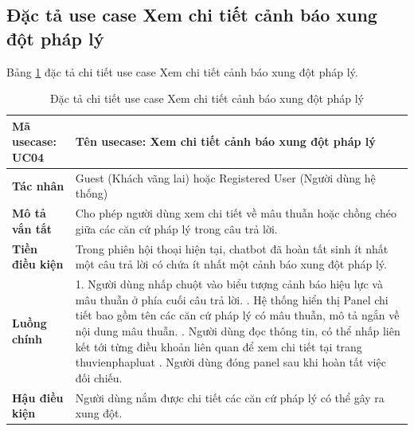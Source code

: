 \documentclass[../DoAn.tex]{subfiles}
\begin{document}
\subsection{Đặc tả use case Xem chi tiết cảnh báo xung đột pháp lý}
Bảng \ref{table:uc_specs_conflict} đặc tả chi tiết use case Xem chi tiết cảnh báo xung đột pháp lý.
\begin{table}[H]
\centering
\begin{tabular}{|p{3.5cm}|p{11.5cm}|}
\hline
\textbf{Mã usecase:} UC04 & \textbf{Tên usecase:} Xem chi tiết cảnh báo xung đột pháp lý \\ \hline
\textbf{Tác nhân} & Guest (Khách vãng lai) hoặc Registered User (Người dùng hệ thống) \\ \hline
\textbf{Mô tả vắn tắt} & Cho phép người dùng xem chi tiết về mâu thuẫn hoặc chồng chéo giữa các căn cứ pháp lý trong câu trả lời. \\ \hline
\textbf{Tiền điều kiện} & Trong phiên hội thoại hiện tại, chatbot đã hoàn tất sinh ít nhất một câu trả lời có chứa ít nhất một cảnh báo xung đột pháp lý. \\ \hline
\textbf{Luồng chính} &
1. Người dùng nhấp chuột vào biểu tượng cảnh báo hiệu lực và mâu thuẫn ở phía cuối câu trả lời. \newline
2. Hệ thống hiển thị Panel chi tiết bao gồm tên các căn cứ pháp lý có mâu thuẫn, mô tả ngắn về nội dung mâu thuẫn. \newline
3. Người dùng đọc thông tin, có thể nhấp liên kết tới từng điều khoản liên quan để xem chi tiết tại trang thuvienphapluat \newline
4. Người dùng đóng panel sau khi hoàn tất việc đối chiếu. \\ \hline
\textbf{Hậu điều kiện} & Người dùng nắm được chi tiết các căn cứ pháp lý có thể gây ra xung đột. \\ \hline
\end{tabular}
\caption{Đặc tả chi tiết use case Xem chi tiết cảnh báo xung đột pháp lý}
\label{table:uc_specs_conflict}
\end{table}
\end{document}
